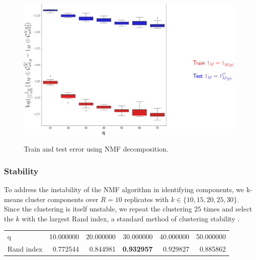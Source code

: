 \begin{figure}[H]
    \centering
    \includegraphics[width = 5in]{figs/nmf_test_train.png} 
    \label{fig:train_test}
    \caption{Train and test error using NMF decomposition.}
\end{figure}

\subsubsection{Stability}

To address the instability of the NMF algorithm in identifying components, we k-means cluster components over $R = 10$ replicates with $k \in \{10,15,20, 25, 30\}$.
Since the clustering is itself unstable, we repeat the clustering $25$ times and select the $k$ with the largest Rand index, a standard method of clustering stability \citep{Rand1971-ny, Meila_2007-xt}.

\begin{tabular}{lrrrrr}
\toprule
q          &  10.000000 &  20.000000 &  30.000000 &  40.000000 &  50.000000 \\
Rand index &   0.772544 &   0.844981 &   \textbf{0.932957} &   0.929827 &   0.885862 \\
\bottomrule
\end{tabular}

